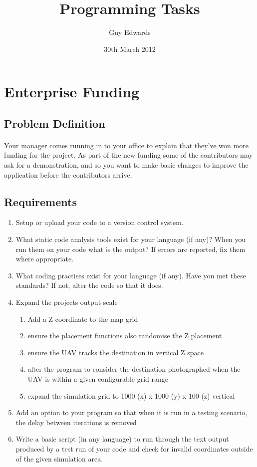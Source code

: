 \documentclass[11pt]{book}
\title{\textbf{Programming Tasks}}
\author{Guy Edwards}
\date{30th March 2012}
\begin{document}
\section{Enterprise Funding}

\subsection{Problem Definition}

\paragraph{} Your manager comes running in to your office to explain that they've won more funding for the project. As part of the new funding some of the contributors may ask for a demonstration, and so you want to make basic changes to improve the application before the contributors arrive.

\subsection{Requirements}

\begin{enumerate}
\item Setup or upload your code to a version control system.
\item What static code analysis tools exist for your language (if any)? When you run them on your code what is the output? If errors are reported, fix them where appropriate.
\item What coding practises exist for your language (if any). Have you met these standards? If not, alter the code so that it does.
\item Expand the projects output scale
    \begin{enumerate}
        \item Add a Z coordinate to the map grid
        \item ensure the placement functions also randomise the Z placement
        \item ensure the UAV tracks the destination in vertical Z space
        \item alter the program to consider the destination photographed when the UAV is within a given configurable grid range
        \item expand the simulation grid to 1000 (x) x 1000 (y) x 100 (z) vertical
    \end{enumerate}
\item Add an option to your program so that when it is run in a testing scenario, the delay between iterations is removed
\item Write a basic script (in any language) to run through the text output produced by a test run of your code and check for invalid coordinates outside of the given simulation area.
\end{enumerate}
\end{document}
